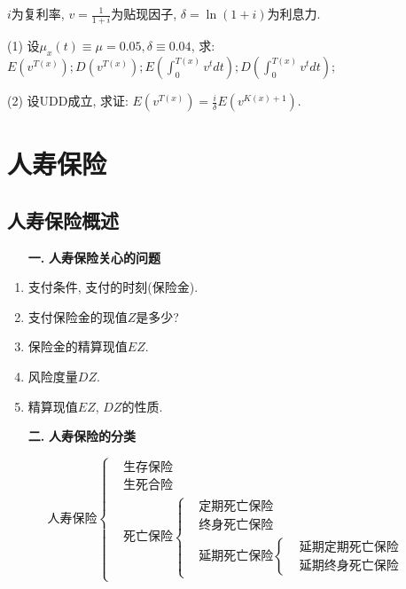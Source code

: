 \documentclass[a4paper,10pt]{ctexbook}
\newcommand{\hei}{\CJKfamily{hei}}      %
\begin{document}
\begin{exs}
    $i$为复利率, $v=\frac{1}{1+i}$为贴现因子, $\delta=\ln (1+i)$为利息力.

    (1) 设$\mu_{x}(t)\equiv \mu =0.05, \delta\equiv 0.04$,
    求: $E(v^{T(x)});D(v^{T(x)}); E(\int_{0}^{T(x)}v^{t}dt); D(\int_{0}^{T(x)}v^{t}dt)$;

    (2) 设UDD成立, 求证: $E(v^{T(x)})=\frac{i}{\delta}E(v^{K(x)+1})$.
\end{exs}


\chapter{人寿保险}
\section{人寿保险概述}
\begin{itemize}
    \item[{\bf\hei 一.}]{\bf\hei 人寿保险关心的问题}
\end{itemize}
\begin{enumerate}
    \item 支付条件, 支付的时刻(保险金).
    \item 支付保险金的现值$Z$是多少?
    \item 保险金的精算现值$EZ$.
    \item 风险度量$DZ$.
    \item 精算现值$EZ$, $DZ$的性质.
\end{enumerate}
\begin{itemize}
    \item[{\bf\hei 二.}]{\bf\hei 人寿保险的分类}
\end{itemize}

\begin{equation*}
    \text{人寿保险}
    \begin{cases}
         & \text{生存保险}                                          \\
         & \text{生死合险}                                          \\
         & \text{死亡保险}\begin{cases}
                           & \text{定期死亡保险}                   \\
                           & \text{终身死亡保险}                   \\
                           & \text{延期死亡保险}\begin{cases}
                                 & \text{延期定期死亡保险} \\
                                 & \text{延期终身死亡保险}
                            \end{cases}
                      \end{cases}
    \end{cases}
\end{equation*}
\end{document}
